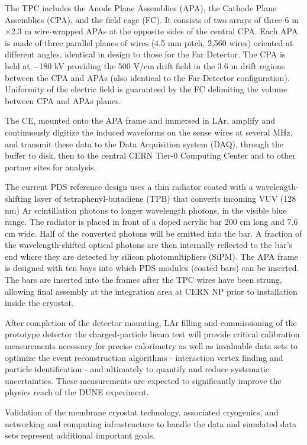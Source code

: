 The TPC includes the Anode Plane Assemblies (APA), the Cathode Plane Assemblies (CPA), and the field cage (FC). It consists of two arrays of three 6 m$\times$2.3 m wire-wrapped APAs at the opposite sides of the central CPA. Each APA is made of three parallel planes of wires (4.5 mm pitch, 2,560 wires) oriented at different angles, identical in design to those for the Far Detector. The CPA is held at $-$180 kV providing the 500 V/cm drift field in the 3.6 m drift regions between the CPA and APAs (also identical to the Far Detector configuration). Uniformity of the electric field is guaranteed by the FC delimiting the volume between CPA and APAs planes.

The CE, mounted onto the APA frame and immersed in LAr, amplify and continuously digitize the induced waveforms on the sense wires at several MHz, and transmit these data to the Data Acquisition system (DAQ), through the buffer to disk, then to the central CERN Tier-0 Computing Center and to other partner sites for analysis.  

The current PDS reference design uses a thin radiator coated with a wavelength-shifting layer of tetraphenyl-butadiene (TPB) that converts incoming VUV (128 nm) Ar scintillation photons to longer wavelength photons, in the visible blue range. The radiator is placed in front of a doped acrylic bar 200 cm long and 7.6 cm wide. Half of the converted photons will be emitted into the bar. A fraction of the wavelength-shifted optical photons are then internally reflected to the bar's end where they are detected by silicon photomultipliers (SiPM).
The APA frame is designed with ten bays into which PDS modules (coated bars) can be inserted. The bars are inserted into the frames after the TPC wires have been strung, allowing final assembly at the integration area at CERN NP prior to installation inside the cryostat. 

After completion of the detector mounting, LAr filling and commissioning of the prototype detector the charged-particle beam test will provide critical calibration measurements necessary for precise calorimetry as well as invaluable data sets to optimize the event reconstruction algorithms - interaction vertex finding and particle identification - and ultimately to quantify and reduce systematic uncertainties. These measurements are expected to significantly improve the physics reach of the DUNE experiment.

Validation of the membrane cryostat technology, associated cryogenics, and networking and computing infrastructure to handle the data and simulated data sets represent additional important goals. 

